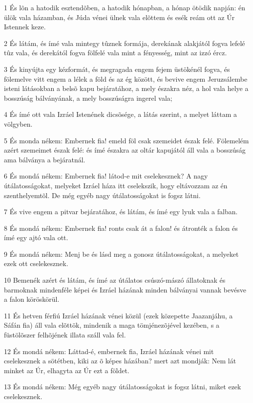 \par 1 És lõn a hatodik esztendõben, a hatodik hónapban, a hónap ötödik napján: én ülök vala házamban, és Júda vénei ülnek vala elõttem és esék reám ott az Úr Istennek keze.
\par 2 És látám, és ímé vala mintegy tûznek formája, derekának alakjától fogva lefelé tûz vala, és derekától fogva fölfelé vala mint a fényesség, mint az izzó ércz.
\par 3 És kinyújta egy kézformát, és megragada engem fejem üstökénél fogva, és fölemelve vitt engem a lélek a föld és az ég között, és bevive engem Jeruzsálembe isteni látásokban a belsõ kapu bejáratához, a mely északra néz, a hol vala helye a bosszúság bálványának, a mely bosszúságra  ingerel vala;
\par 4 És ímé ott vala Izráel Istenének dicsõsége, a látás szerint, a melyet láttam a völgyben.
\par 5 És monda nékem: Embernek fia! emeld föl csak szemeidet észak felé. Fölemelém azért szemeimet észak felé: és ímé északra az oltár kapujától áll vala a bosszúság ama bálványa a bejáratnál.
\par 6 És mondá nékem: Embernek fia! látod-e mit cselekesznek? A nagy útálatosságokat, melyeket Izráel háza itt cselekszik, hogy eltávozzam az én szenthelyemtõl. De még egyéb nagy útálatosságokat is fogsz látni.
\par 7 És vive engem a pitvar bejáratához, és látám, és ímé egy lyuk vala a falban.
\par 8 És mondá nékem: Embernek fia! ronts csak át a falon! és átronték a falon és ímé egy ajtó vala ott.
\par 9 És mondá nékem: Menj be és lásd meg a gonosz útálatosságokat, a melyeket ezek ott cselekesznek.
\par 10 Bemenék azért és látám, és ímé az útálatos csúszó-mászó állatoknak és barmoknak mindenféle képei és Izráel házának minden bálványai vannak bevésve a falon köröskörül.
\par 11 És hetven férfiú Izráel házának vénei közül (ezek közepette Jaazanjáhu, a Sáfán fia) áll vala elõttök, mindenik a maga tömjénezõjével kezében, s a füstölõszer felhõjének illata száll vala fel.
\par 12 És mondá nékem: Láttad-é, embernek fia, Izráel házának vénei mit cselekesznek a sötétben, kiki az õ képes házában? mert azt mondják: Nem lát minket az Úr, elhagyta az Úr ezt a földet.
\par 13 És mondá nékem: Még egyéb nagy útálatosságokat is fogsz látni, miket ezek cselekesznek.
